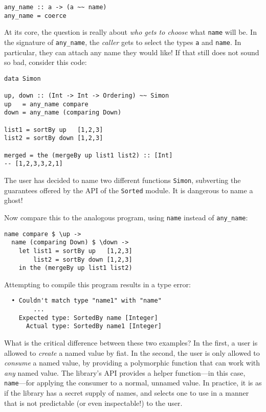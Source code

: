 \documentclass[format=sigplan, review=false, screen=true]{acmart}
\begin{document}
\begin{verbatim}
any_name :: a -> (a ~~ name)
any_name = coerce
\end{verbatim}

At its core, the question is really about \emph{who gets to choose} what \texttt{name} will be.
In the signature of \texttt{any\_name}, the \emph{caller} gets to select the types \texttt{a}
and \texttt{name}. In particular, they can attach any name they would like!
If that still does not sound so bad, consider this code:

\begin{verbatim}
data Simon
  
up, down :: (Int -> Int -> Ordering) ~~ Simon
up   = any_name compare
down = any_name (comparing Down)

list1 = sortBy up   [1,2,3]
list2 = sortBy down [1,2,3]

merged = the (mergeBy up list1 list2) :: [Int]
-- [1,2,3,3,2,1]
\end{verbatim}
\noindent
The user has decided to name two different functions \texttt{Simon}, subverting the
guarantees offered by the API of the \texttt{Sorted} module. It is dangerous to
name a ghost!

Now compare this to the analogous program, using \texttt{name} instead of \texttt{any\_name}:
\begin{verbatim}
name compare $ \up ->
  name (comparing Down) $ \down ->
    let list1 = sortBy up   [1,2,3]
        list2 = sortBy down [1,2,3]
    in the (mergeBy up list1 list2)
\end{verbatim}
\noindent
Attempting to compile this program results in a type error:

\begin{lstlisting}
  • Couldn't match type "name1" with "name"
        ...
    Expected type: SortedBy name [Integer]
      Actual type: SortedBy name1 [Integer]
\end{lstlisting}
\noindent
What is the critical difference between these two examples? In the first, a user is
allowed to \emph{create} a named value by fiat. In the second, the user is only allowed to \emph{consume} a named value, by
providing a polymorphic function that can work with \emph{any} named value. The library's API provides
a helper function---in this case, \texttt{name}---for applying the consumer to a normal, unnamed value.
In practice, it is as if the
library has a secret supply of names, and selects one to use in a manner that is not
predictable (or even inspectable!) to the user.
\end{document}

